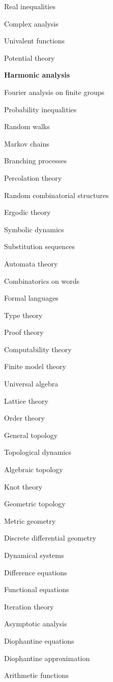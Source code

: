 \item Real inequalities
\item Complex analysis
\item Univalent functions
\item Potential theory
\item \textbf{Harmonic analysis}
\item Fourier analysis on finite groups
\item Probability inequalities
\item Random walks
\item Markov chains
\item Branching processes
\item Percolation theory
\item Random combinatorial structures
\item Ergodic theory
\item Symbolic dynamics
\item Substitution sequences
\item Automata theory
\item Combinatorics on words
\item Formal languages
\item Type theory
\item Proof theory
\item Computability theory
\item Finite model theory
\item Universal algebra
\item Lattice theory
\item Order theory
\item General topology
\item Topological dynamics
\item Algebraic topology
\item Knot theory
\item Geometric topology
\item Metric geometry
\item Discrete differential geometry
\item Dynamical systems
\item Difference equations
\item Functional equations
\item Iteration theory
\item Asymptotic analysis
\item Diophantine equations
\item Diophantine approximation
\item Arithmetic functions
